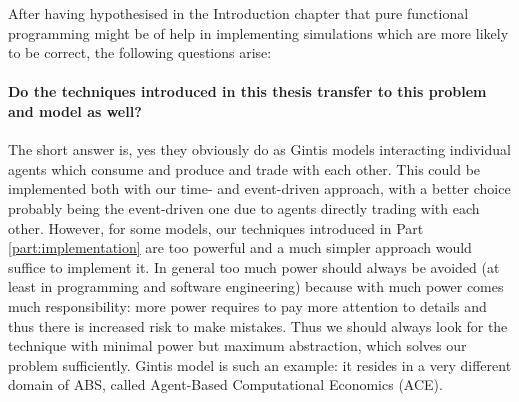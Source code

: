 After having hypothesised in the Introduction chapter that pure functional programming might be of help in implementing simulations which are more likely to be correct, the following questions arise:

\paragraph{Do the techniques introduced in this thesis transfer to this problem and model as well?}
The short answer is, yes they obviously do as Gintis models interacting individual agents which consume and produce and trade with each other. This could be implemented both with our time- and event-driven approach, with a better choice probably being the event-driven one due to agents directly trading with each other. However, for some models, our techniques introduced in Part \ref{part:implementation} are too powerful and a much simpler approach would suffice to implement it. In general too much power should always be avoided (at least in programming and software engineering) because with much power comes much responsibility: more power requires to pay more attention to details and thus there is increased risk to make mistakes. Thus we should always look for the technique with minimal power but maximum abstraction, which solves our problem sufficiently. Gintis model is such an example: it resides in a very different domain of ABS, called Agent-Based Computational Economics (ACE).

